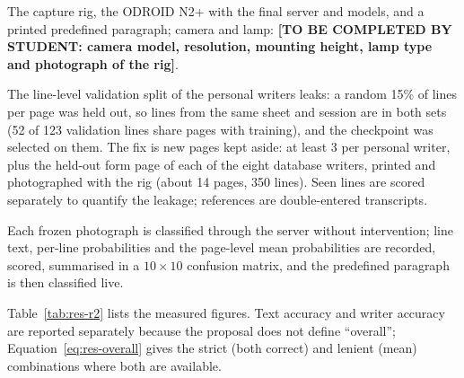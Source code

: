 
            The capture rig, the ODROID N2+ with the final server and models, and a printed predefined paragraph; camera and lamp: \textbf{[TO BE COMPLETED BY STUDENT: camera model, resolution, mounting height, lamp type and photograph of the rig]}.


            The line-level validation split of the personal writers leaks: a random 15\% of lines per page was held out, so lines from the same sheet and session are in both sets (52 of 123 validation lines share pages with training), and the checkpoint was selected on them.
            The fix is new pages kept aside: at least 3 per personal writer, plus the held-out form page of each of the eight database writers, printed and photographed with the rig (about 14 pages, 350 lines).
            Seen lines are scored separately to quantify the leakage; references are double-entered transcripts.


            Each frozen photograph is classified through the server without intervention; line text, per-line probabilities and the page-level mean probabilities are recorded, scored, summarised in a $10\times10$ confusion matrix, and the predefined paragraph is then classified live.


            Table~\ref{tab:res-r2} lists the measured figures.
            Text accuracy and writer accuracy are reported separately because the proposal does not define ``overall''; Equation~\ref{eq:res-overall} gives the strict (both correct) and lenient (mean) combinations where both are available.

